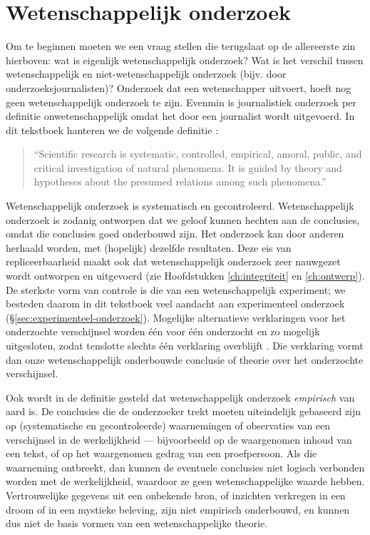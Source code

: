 \documentclass[
]{book}
\begin{document}
\hypertarget{sec:wetenschappelijk-onderzoek}{%
\section{Wetenschappelijk onderzoek}\label{sec:wetenschappelijk-onderzoek}}

Om te beginnen moeten we een vraag stellen die terugslaat op de
allereerste zin hierboven: wat is eigenlijk wetenschappelijk onderzoek?
Wat is het verschil tussen wetenschappelijk en niet-wetenschappelijk
onderzoek (bijv. door onderzoeksjournalisten)? Onderzoek dat een
wetenschapper uitvoert, hoeft nog geen wetenschappelijk onderzoek te
zijn. Evenmin is journalistiek onderzoek per definitie
onwetenschappelijk omdat het door een journalist wordt uitgevoerd. In
dit tekstboek hanteren we de volgende definitie \citep[p.14]{KL00}:

\begin{quote}
``Scientific
research is systematic, controlled, empirical, amoral, public, and
critical investigation of natural phenomena. It is guided by theory and hypotheses about the presumed relations among such phenomena.''
\end{quote}

Wetenschappelijk onderzoek is systematisch en gecontroleerd.
Wetenschappelijk onderzoek is zodanig ontworpen dat we geloof kunnen
hechten aan de conclusies, omdat die conclusies goed onderbouwd zijn.
Het onderzoek kan door anderen herhaald worden, met (hopelijk) dezelfde
resultaten. Deze eis van repliceerbaarheid maakt ook dat
wetenschappelijk onderzoek zeer nauwgezet wordt ontworpen en uitgevoerd
(zie Hoofdstukken \ref{ch:integriteit} en \ref{ch:ontwerp}). De sterkste vorm van controle is die van een
wetenschappelijk experiment; we besteden daarom in dit tekstboek veel
aandacht aan experimenteel onderzoek (§\ref{sec:experimenteel-onderzoek}). Mogelijke alternatieve
verklaringen voor het onderzochte verschijnsel worden één voor één
onderzocht en zo mogelijk uitgesloten, zodat tenslotte slechts één
verklaring overblijft \citep{KL00}. Die verklaring vormt dan onze
wetenschappelijk onderbouwde conclusie of theorie over het onderzochte
verschijnsel.

Ook wordt in de definitie gesteld dat wetenschappelijk onderzoek
\emph{empirisch} van aard is. De conclusies die de onderzoeker trekt moeten
uiteindelijk gebaseerd zijn op (systematische en gecontroleerde)
waarnemingen of observaties van een verschijnsel in de werkelijkheid --- bijvoorbeeld op de waargenomen inhoud van een tekst, of op het
waargenomen gedrag van een proefpersoon. Als die waarneming ontbreekt,
dan kunnen de eventuele conclusies niet logisch verbonden worden met de werkelijkheid, waardoor ze geen wetenschappelijke waarde hebben.
Vertrouwelijke gegevens uit een onbekende bron, of inzichten verkregen
in een droom of in een mystieke beleving, zijn niet empirisch
onderbouwd, en kunnen dus niet de basis vormen van een wetenschappelijke theorie.
\end{document}
